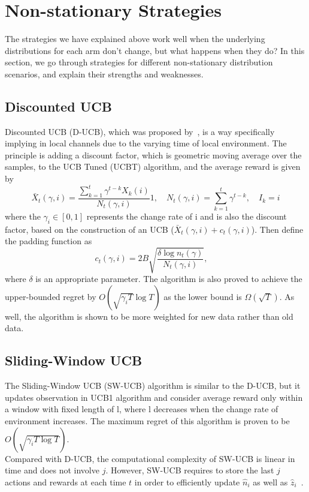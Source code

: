 \section{Non-stationary Strategies}\label{sec:non-stationary-strategies}
The strategies we have explained above work well when the underlying distributions for each arm don't change, but what happens when they do?
In this section, we go through strategies for different non-stationary distribution scenarios, and explain their strengths and weaknesses.

\subsection{Discounted UCB}\label{subsec:discounted-ucb}
Discounted UCB (D-UCB), which was proposed by~\citep{kocsis2006discounted}, is a way specifically implying in local channels due to the varying time of local environment.
The principle is adding a discount factor, which is geometric moving average over the samples, to the UCB Tuned (UCBT) algorithm, and the average reward is given by
\begin{equation*}
    \bar{X}_t\left(\gamma,i\right)=\frac{\sum_{k=1}^t\gamma^{t-k}X_k\left(i\right)}{N_t\left(\gamma,i\right)}\mathfrak{1}, \quad
    N_t(\gamma,i)=\sum_{k=1}^t\gamma^{t-k}, \quad
    I_k=i
\end{equation*}
where the $\gamma_i \in[0,1]$ represents the change rate of i and is also the discount factor, based on the construction of an UCB ($\bar{X}_t\left(\gamma,i\right)+c_t\left(\gamma,i\right)$).
Then define the padding function as
\begin{equation*}
    c_t\left(\gamma,i\right)=2B\sqrt{\frac{\delta\log{n_t(\gamma)}}{N_t\left(\gamma,i\right)}}, \quad
\end{equation*}
where $\delta$ is an appropriate parameter.
\newline The algorithm is also proved to achieve the upper-bounded regret by $O\left(\sqrt{\gamma_{i}T}\log{T}\right)$ as the lower bound is $\Omega\left(\sqrt{T}\right)$\citep{Liu_Lee_Shroff_2018}.
As well, the algorithm is shown to be more weighted for new data rather than old data.

\subsection{Sliding-Window UCB}\label{subsec:sliding-window-ucb}
The Sliding-Window UCB (SW-UCB) algorithm is similar to the D-UCB, but it updates observation in UCB1 algorithm and consider average reward only within a window with fixed length of l, where l decreases when the change rate of environment increases.
The maximum regret of this algorithm is proven to be $O\left(\sqrt{\gamma_{i}T\log{T}}\right)$\citep{garivier2008upper}.
\\Compared with D-UCB, the computational complexity of SW-UCB is linear in time and does not involve $j$.
However, SW-UCB requires to store the last $j$ actions and rewards at each time $t$ in order to efficiently update ${\hat{n}_i}$ as well as ${\hat{z}_i}$~\citep{garivier2008upper}.

